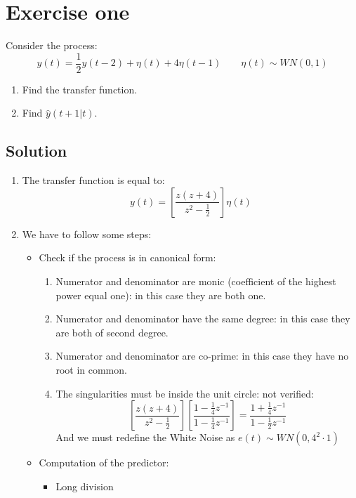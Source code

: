 \section{Exercise one}

Consider the process: 
\[y(t)=\dfrac{1}{2}y(t-2)+\eta(t)+4\eta(t-1)\qquad \eta(t)\sim WN(0,1)\]
\begin{enumerate}
    \item Find the transfer function. 
    \item Find $\hat{y}(t+1|t)$. 
\end{enumerate}

\subsection{Solution}
\begin{enumerate}
    \item The transfer function is equal to: 
        \[y(t)=\left[\dfrac{z(z+4)}{z^2-\frac{1}{2}}\right]\eta(t)\]
    \item We have to follow some steps: 
        \begin{itemize}
            \item Check if the process is in canonical form: 
                \begin{enumerate}
                    \item Numerator and denominator are monic (coefficient of the highest power equal one): in this case they are both one. 
                    \item Numerator and denominator have the same degree: in this case they are both of second degree. 
                    \item Numerator and denominator are co-prime: in this case they have no root in common. 
                    \item The singularities must be inside the unit circle: not verified: 
                        \[\left[\dfrac{z(z+4)}{z^2-\frac{1}{2}}\right]\left[\dfrac{1-\frac{1}{4}z^{-1}}{1-\frac{1}{4}z^{-1}}\right]=\dfrac{1+\frac{1}{4}z^{-1}}{1-\frac{1}{2}z^{-1}}\]
                        And we must redefine the White Noise as $e(t)\sim WN(0,4^2\cdot 1)$
                \end{enumerate}
            \item Computation of the predictor: 
                \begin{itemize}
                    \item Long division
                \end{itemize}
        \end{itemize}
\end{enumerate}







